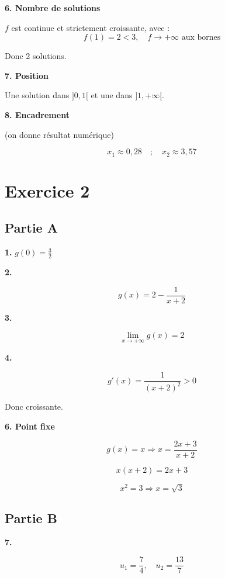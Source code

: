 \documentclass[11pt,a4paper]{article}
\begin{document}
\textbf{6. Nombre de solutions}

$f$ est continue et strictement croissante, avec :
\[
f(1)=2<3,\quad f\to+\infty \text{ aux bornes}
\]

Donc 2 solutions.

\bigskip

\textbf{7. Position}

Une solution dans $]0,1[$ et une dans $]1,+\infty[$.

\bigskip

\textbf{8. Encadrement}

(on donne résultat numérique)

\[
x_1 \approx 0{,}28 \quad ; \quad x_2 \approx 3{,}57
\]

\bigskip

\section*{Exercice 2}

\subsection*{Partie A}

\textbf{1.} $g(0)=\frac{3}{2}$

\bigskip

\textbf{2.}

\[
g(x)=2-\frac{1}{x+2}
\]

\bigskip

\textbf{3.}

\[
\lim_{x\to+\infty} g(x)=2
\]

\bigskip

\textbf{4.}

\[
g'(x)=\frac{1}{(x+2)^2}>0
\]

Donc croissante.

\bigskip

\textbf{6. Point fixe}

\[
g(x)=x \Rightarrow x=\frac{2x+3}{x+2}
\]

\[
x(x+2)=2x+3
\]

\[
x^2=3 \Rightarrow x=\sqrt{3}
\]

\bigskip

\subsection*{Partie B}

\textbf{7.}

\[
u_1=\frac{7}{4},\quad u_2=\frac{13}{7}
\]
\end{document}
